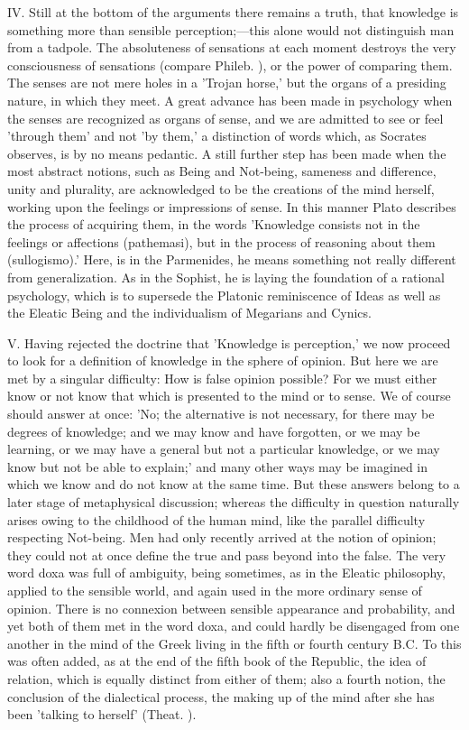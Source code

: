 \documentclass[11pt,letter]{article}
\begin{document}
\par  IV. Still at the bottom of the arguments there remains a truth, that knowledge is something more than sensible perception;—this alone would not distinguish man from a tadpole. The absoluteness of sensations at each moment destroys the very consciousness of sensations (compare Phileb. ), or the power of comparing them. The senses are not mere holes in a 'Trojan horse,' but the organs of a presiding nature, in which they meet. A great advance has been made in psychology when the senses are recognized as organs of sense, and we are admitted to see or feel 'through them' and not 'by them,' a distinction of words which, as Socrates observes, is by no means pedantic. A still further step has been made when the most abstract notions, such as Being and Not-being, sameness and difference, unity and plurality, are acknowledged to be the creations of the mind herself, working upon the feelings or impressions of sense. In this manner Plato describes the process of acquiring them, in the words 'Knowledge consists not in the feelings or affections (pathemasi), but in the process of reasoning about them (sullogismo).' Here, is in the Parmenides, he means something not really different from generalization. As in the Sophist, he is laying the foundation of a rational psychology, which is to supersede the Platonic reminiscence of Ideas as well as the Eleatic Being and the individualism of Megarians and Cynics.

\par  V. Having rejected the doctrine that 'Knowledge is perception,' we now proceed to look for a definition of knowledge in the sphere of opinion. But here we are met by a singular difficulty: How is false opinion possible? For we must either know or not know that which is presented to the mind or to sense. We of course should answer at once: 'No; the alternative is not necessary, for there may be degrees of knowledge; and we may know and have forgotten, or we may be learning, or we may have a general but not a particular knowledge, or we may know but not be able to explain;' and many other ways may be imagined in which we know and do not know at the same time. But these answers belong to a later stage of metaphysical discussion; whereas the difficulty in question naturally arises owing to the childhood of the human mind, like the parallel difficulty respecting Not-being. Men had only recently arrived at the notion of opinion; they could not at once define the true and pass beyond into the false. The very word doxa was full of ambiguity, being sometimes, as in the Eleatic philosophy, applied to the sensible world, and again used in the more ordinary sense of opinion. There is no connexion between sensible appearance and probability, and yet both of them met in the word doxa, and could hardly be disengaged from one another in the mind of the Greek living in the fifth or fourth century B.C. To this was often added, as at the end of the fifth book of the Republic, the idea of relation, which is equally distinct from either of them; also a fourth notion, the conclusion of the dialectical process, the making up of the mind after she has been 'talking to herself' (Theat. ).
\end{document}

